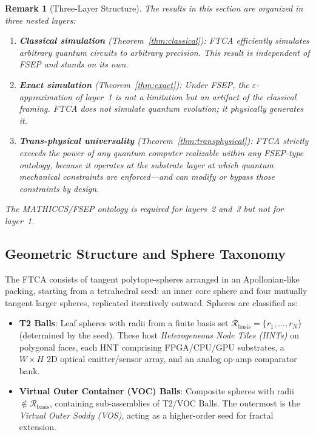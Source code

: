 \documentclass[11pt,letterpaper]{article}
\newtheorem{remark}{Remark}
\begin{document}
\begin{remark}[Three-Layer Structure]
The results in this section are organized in three nested layers:
\begin{enumerate}
  \item \textbf{Classical simulation} (Theorem~\ref{thm:classical}): FTCA efficiently simulates arbitrary quantum circuits to arbitrary precision. This result is independent of FSEP and stands on its own.
  \item \textbf{Exact simulation} (Theorem~\ref{thm:exact}): Under FSEP, the $\varepsilon$-approximation of layer~1 is not a limitation but an artifact of the classical framing. FTCA does not simulate quantum evolution; it physically generates it.
  \item \textbf{Trans-physical universality} (Theorem~\ref{thm:transphysical}): FTCA strictly exceeds the power of any quantum computer realizable within any FSEP-type ontology, because it operates at the substrate layer at which quantum mechanical constraints are enforced---and can modify or bypass those constraints by design.
\end{enumerate}
The MATHICCS/FSEP ontology is required for layers~2 and~3 but not for layer~1.
\end{remark}

\subsection{Geometric Structure and Sphere Taxonomy}

The FTCA consists of tangent polytope-spheres arranged in an Apollonian-like packing, starting from a tetrahedral seed: an inner core sphere and four mutually tangent larger spheres, replicated iteratively outward. Spheres are classified as:
\begin{itemize}
\item \textbf{T2 Balls}: Leaf spheres with radii from a finite basis set $\mathcal{R}_{\text{basis}} = \{r_1, \dots, r_N\}$ (determined by the seed). These host \emph{Heterogeneous Node Tiles (HNTs)} on polygonal faces, each HNT comprising FPGA/CPU/GPU substrates, a $W \times H$ 2D optical emitter/sensor array, and an analog op-amp comparator bank.
\item \textbf{Virtual Outer Container (VOC) Balls}: Composite spheres with radii $\notin \mathcal{R}_{\text{basis}}$, containing sub-assemblies of T2/VOC Balls. The outermost is the \emph{Virtual Outer Soddy (VOS)}, acting as a higher-order seed for fractal extension.
\end{itemize}
\end{document}
